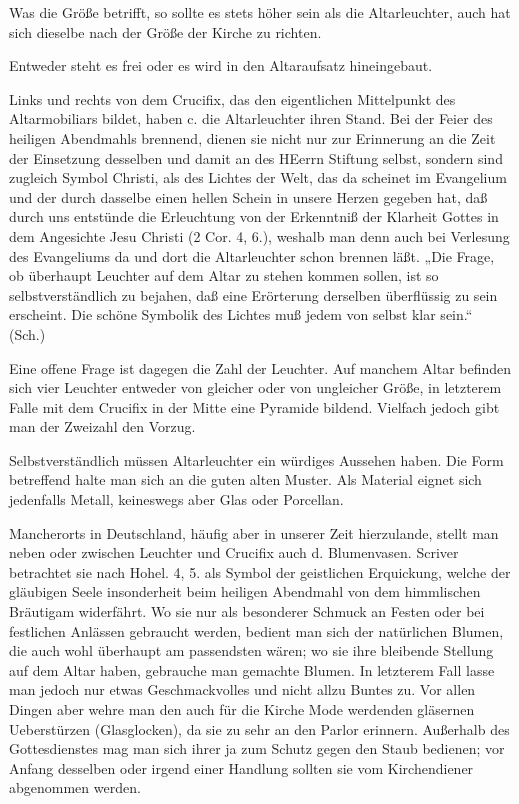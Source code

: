 Was die Größe betrifft, so sollte es stets höher sein als die Altarleuchter, auch hat sich dieselbe nach der Größe der Kirche zu richten.

Entweder steht es frei oder es wird in den Altaraufsatz hineingebaut.

Links und rechts von dem Crucifix, das den eigentlichen Mittelpunkt des Altarmobiliars bildet, haben c. die Altarleuchter ihren Stand. Bei der Feier des heiligen Abendmahls brennend, dienen sie nicht nur zur Erinnerung an die Zeit der Einsetzung desselben und damit an des HEerrn Stiftung selbst, sondern sind zugleich Symbol Christi, als des Lichtes der Welt, das da scheinet im Evangelium und der durch dasselbe einen hellen Schein in unsere Herzen gegeben hat, daß durch uns entstünde die Erleuchtung von der Erkenntniß der Klarheit Gottes in dem Angesichte Jesu Christi (2 Cor. 4, 6.), weshalb man denn auch bei Verlesung des Evangeliums da und dort die Altarleuchter schon brennen läßt. „Die Frage, ob überhaupt Leuchter auf dem Altar zu stehen kommen sollen, ist so selbstverständlich zu bejahen, daß eine Erörterung derselben überflüssig zu sein erscheint. Die schöne Symbolik des Lichtes muß jedem von selbst klar sein.“ (Sch.)

Eine offene Frage ist dagegen die Zahl der Leuchter. Auf manchem Altar befinden sich vier Leuchter entweder von gleicher oder von ungleicher Größe, in letzterem Falle mit dem Crucifix in der Mitte eine Pyramide bildend. Vielfach jedoch gibt man der Zweizahl den Vorzug.

Selbstverständlich müssen Altarleuchter ein würdiges Aussehen haben. Die Form betreffend halte man sich an die guten alten Muster. Als Material eignet sich jedenfalls Metall, keineswegs aber Glas oder Porcellan.

Mancherorts in Deutschland, häufig aber in unserer Zeit hierzulande, stellt man neben oder zwischen Leuchter und Crucifix auch
d. Blumenvasen. Scriver betrachtet sie nach Hohel. 4, 5. als Symbol der geistlichen Erquickung, welche der gläubigen Seele insonderheit beim heiligen Abendmahl von dem himmlischen Bräutigam widerfährt. Wo sie nur als besonderer Schmuck an Festen oder bei festlichen Anlässen gebraucht werden, bedient man sich der natürlichen Blumen, die auch wohl überhaupt am passendsten wären; wo sie ihre bleibende Stellung auf dem Altar haben, gebrauche man gemachte Blumen. In letzterem Fall lasse man jedoch nur etwas Geschmackvolles und nicht allzu Buntes zu. Vor allen Dingen aber wehre man den auch für die Kirche Mode werdenden gläsernen Ueberstürzen (Glasglocken), da sie zu sehr an den Parlor erinnern. Außerhalb des Gottesdienstes mag man sich ihrer ja zum Schutz gegen den Staub bedienen; vor Anfang desselben oder irgend einer Handlung sollten sie vom Kirchendiener abgenommen werden.

